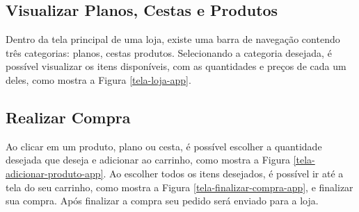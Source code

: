 \subsection{Visualizar Planos, Cestas e Produtos}
Dentro da tela principal de uma loja, existe uma barra de navegação contendo três categorias: planos, cestas produtos. Selecionando a categoria desejada, é possível visualizar os itens disponíveis, com as quantidades e preços de cada um deles, como mostra a Figura \ref{tela-loja-app}.

\subsection{Realizar Compra}
Ao clicar em um produto, plano ou cesta, é possível escolher a quantidade desejada que deseja e adicionar ao carrinho, como mostra a Figura \ref{tela-adicionar-produto-app}. Ao escolher todos os itens desejados, é possível ir até a tela do seu carrinho, como mostra a Figura \ref{tela-finalizar-compra-app}, e finalizar sua compra. Após finalizar a compra seu pedido será enviado para a loja.

